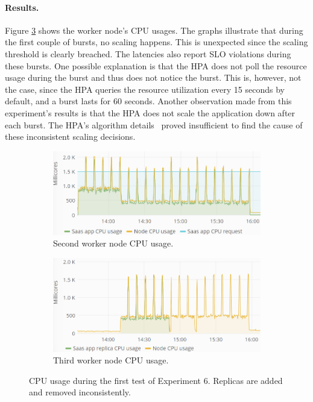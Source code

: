 \paragraph{Results.}
Figure \ref{fig:cpu-saas-hpa-bursty} shows the worker node's CPU usages. The graphs illustrate that during the first couple of bursts, no scaling happens. This is unexpected since the scaling threshold is clearly breached. The latencies also report SLO violations during these bursts. One possible explanation is that the HPA does not poll the resource usage during the burst and thus does not notice the burst. This is, however, not the case, since the HPA queries the resource utilization every 15 seconds by default, and a burst lasts for 60 seconds. Another observation made from this experiment's results is that the HPA does not scale the application down after each burst. The HPA's algorithm details~\citep{HPA} proved insufficient to find the cause of these inconsistent scaling decisions. 


\begin{figure}
\centering
\begin{subfigure}[b]{\columnwidth}
\centering
\includegraphics[width=0.75\columnwidth]{Images/Experiments/CPU/Grafana/cpu-saas-hpa-bursty-2-1.PNG}
\caption{Second worker node CPU usage.}
\label{fig:cpu-saas-hpa-bursty-2-1}
\end{subfigure}
\hfill
\begin{subfigure}[b]{\columnwidth}
\centering
\includegraphics[width=0.75\columnwidth]{Images/Experiments/CPU/Grafana/cpu-saas-hpa-bursty-2-2.PNG}
\caption{Third worker node CPU usage.}
\label{fig:cpu-saas-hpa-bursty-2-2}
\end{subfigure}
\hfill
\vspace*{-7mm}
\caption{CPU usage during the first test of Experiment 6. Replicas are added and removed inconsistently.}
\label{fig:cpu-saas-hpa-bursty}
\end{figure}


